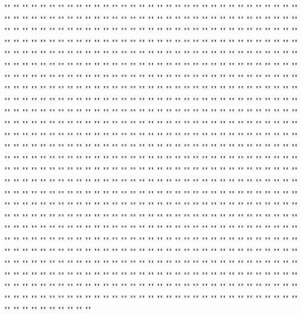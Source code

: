 ""	""	""	""	""	""	""
""	""	""	""	""	""	""
""	""	""	""	""	""	""
""	""	""	""	""	""	""
""	""	""	""	""	""	""
""	""	""	""	""	""	""
""	""	""	""	""	""	""
""	""	""	""	""	""	""
""	""	""	""	""	""	""
""	""	""	""	""	""	""
""	""	""	""	""	""	""
""	""	""	""	""	""	""
""	""	""	""	""	""	""
""	""	""	""	""	""	""
""	""	""	""	""	""	""
""	""	""	""	""	""	""
""	""	""	""	""	""	""
""	""	""	""	""	""	""
""	""	""	""	""	""	""
""	""	""	""	""	""	""
""	""	""	""	""	""	""
""	""	""	""	""	""	""
""	""	""	""	""	""	""
""	""	""	""	""	""	""
""	""	""	""	""	""	""
""	""	""	""	""	""	""
""	""	""	""	""	""	""
""	""	""	""	""	""	""
""	""	""	""	""	""	""
""	""	""	""	""	""	""
""	""	""	""	""	""	""
""	""	""	""	""	""	""
""	""	""	""	""	""	""
""	""	""	""	""	""	""
""	""	""	""	""	""	""
""	""	""	""	""	""	""
""	""	""	""	""	""	""
""	""	""	""	""	""	""
""	""	""	""	""	""	""
""	""	""	""	""	""	""
""	""	""	""	""	""	""
""	""	""	""	""	""	""
""	""	""	""	""	""	""
""	""	""	""	""	""	""
""	""	""	""	""	""	""
""	""	""	""	""	""	""
""	""	""	""	""	""	""
""	""	""	""	""	""	""
""	""	""	""	""	""	""
""	""	""	""	""	""	""
""	""	""	""	""	""	""
""	""	""	""	""	""	""
""	""	""	""	""	""	""
""	""	""	""	""	""	""
""	""	""	""	""	""	""
""	""	""	""	""	""	""
""	""	""	""	""	""	""
""	""	""	""	""	""	""
""	""	""	""	""	""	""
""	""	""	""	""	""	""
""	""	""	""	""	""	""
""	""	""	""	""	""	""
""	""	""	""	""	""	""
""	""	""	""	""	""	""
""	""	""	""	""	""	""
""	""	""	""	""	""	""
""	""	""	""	""	""	""
""	""	""	""	""	""	""
""	""	""	""	""	""	""
""	""	""	""	""	""	""
""	""	""	""	""	""	""
""	""	""	""	""	""	""
""	""	""	""	""	""	""
""	""	""	""	""	""	""
""	""	""	""	""	""	""
""	""	""	""	""	""	""
""	""	""	""	""	""	""
""	""	""	""	""	""	""
""	""	""	""	""	""	""
""	""	""	""	""	""	""
""	""	""	""	""	""	""
""	""	""	""	""	""	""
""	""	""	""	""	""	""
""	""	""	""	""	""	""
""	""	""	""	""	""	""
""	""	""	""	""	""	""
""	""	""	""	""	""	""
""	""	""	""	""	""	""
""	""	""	""	""	""	""
""	""	""	""	""	""	""
""	""	""	""	""	""	""
""	""	""	""	""	""	""
""	""	""	""	""	""	""
""	""	""	""	""	""	""
""	""	""	""	""	""	""
""	""	""	""	""	""	""
""	""	""	""	""	""	""
""	""	""	""	""	""	""
""	""	""	""	""	""	""
""	""	""	""	""	""	""
""	""	""	""	""	""	""
""	""	""	""	""	""	""
""	""	""	""	""	""	""
""	""	""	""	""	""	""
""	""	""	""	""	""	""
""	""	""	""	""	""	""
""	""	""	""	""	""	""
""	""	""	""	""	""	""
""	""	""	""	""	""	""
""	""	""	""	""	""	""
""	""	""	""	""	""	""
""	""	""	""	""	""	""
""	""	""	""	""	""	""
""	""	""	""	""	""	""
""	""	""	""	""	""	""
""	""	""	""	""	""	""
""	""	""	""	""	""	""
""	""	""	""	""	""	""
""	""	""	""	""	""	""
""	""	""	""	""	""	""
""	""	""	""	""	""	""
""	""	""	""	""	""	""
""	""	""	""	""	""	""
""	""	""	""	""	""	""

